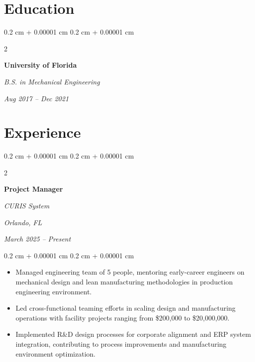 \documentclass[10pt, letterpaper]{article}
\newenvironment{highlights}{
    \begin{itemize}[
        topsep=0.10 cm,
        parsep=0.10 cm,
        partopsep=0pt,
        itemsep=0pt,
        leftmargin=0.4 cm + 10pt
    ]
}{
    \end{itemize}
} %
\newenvironment{onecolentry}{
    \begin{adjustwidth}{
        0.2 cm + 0.00001 cm
    }{
        0.2 cm + 0.00001 cm
    }
}{
    \end{adjustwidth}
} %
\newenvironment{twocolentry}[2][]{
    \onecolentry
    \def\secondColumn{#2}
    \setcolumnwidth{\fill, 4.5 cm}
    \begin{paracol}{2}
}{
    \switchcolumn \raggedleft \secondColumn
    \end{paracol}
    \endonecolentry
} %
\begin{document}
        \vspace{0.3 cm}


    

    \section{Education}

\vspace{0.2 cm}
        
        \begin{twocolentry}{
            
            
        \textit{Aug 2017 – Dec 2021}}
            \textbf{University of Florida}
            
            \textit{B.S. in Mechanical Engineering}
        \end{twocolentry}

        \vspace{0.15 cm}
        

\vspace{0.3 cm}

    
    \section{Experience}

        \vspace{0.2 cm}

        \begin{twocolentry}{
        \textit{Orlando, FL}    
            
        \textit{March 2025 – Present}}
            \textbf{Project Manager}
            
            \textit{CURIS System}
        \end{twocolentry}

        \vspace{0.10 cm}
        \begin{onecolentry}
            \begin{highlights}
                \item Managed engineering team of 5 people, mentoring early-career engineers on mechanical design and lean manufacturing methodologies in production engineering environment.
                \item Led cross-functional teaming efforts in scaling design and manufacturing operations with facility projects ranging from \$200,000 to \$20,000,000.
                \item Implemented R\&D design processes for corporate alignment and ERP system integration, contributing to process improvements and manufacturing environment optimization.
            \end{highlights}
        \end{onecolentry}
\end{document}
